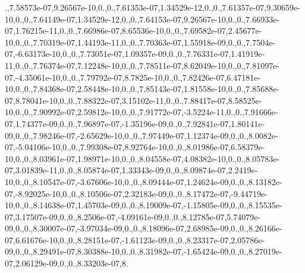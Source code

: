 \begin{DoxyCompactItemize}
.,7.\-58573e-\/07,9.\-26567e-\/10,0.,0.,7.\-61353e-\/07,1.\-34529e-\/12,0.,0.,7.\-61357e-\/07,9.\-30659e-\/10,0.,0.,7.\-64149e-\/07,1.\-34529e-\/12,0.,0.,7.\-64153e-\/07,9.\-26567e-\/10,0.,0.,7.\-66933e-\/07,1.\-76215e-\/11,0.,0.,7.\-66986e-\/07,8.\-65536e-\/10,0.,0.,7.\-69582e-\/07,2.\-45677e-\/10,0.,0.,7.\-70319e-\/07,1.\-44193e-\/11,0.,0.,7.\-70363e-\/07,1.\-55918e-\/09,0.,0.,7.\-7504e-\/07,-\/6.\-63173e-\/10,0.,0.,7.\-73051e-\/07,1.\-09357e-\/09,0.,0.,7.\-76331e-\/07,1.\-41919e-\/11,0.,0.,7.\-76374e-\/07,7.\-12248e-\/10,0.,0.,7.\-78511e-\/07,8.\-62049e-\/10,0.,0.,7.\-81097e-\/07,-\/4.\-35061e-\/10,0.,0.,7.\-79792e-\/07,8.\-7825e-\/10,0.,0.,7.\-82426e-\/07,6.\-47181e-\/10,0.,0.,7.\-84368e-\/07,2.\-58448e-\/10,0.,0.,7.\-85143e-\/07,1.\-81558e-\/10,0.,0.,7.\-85688e-\/07,8.\-78041e-\/10,0.,0.,7.\-88322e-\/07,3.\-15102e-\/11,0.,0.,7.\-88417e-\/07,8.\-58525e-\/10,0.,0.,7.\-90992e-\/07,2.\-59812e-\/10,0.,0.,7.\-91772e-\/07,-\/3.\-5224e-\/11,0.,0.,7.\-91666e-\/07,1.\-74377e-\/09,0.,0.,7.\-96897e-\/07,-\/1.\-35196e-\/09,0.,0.,7.\-92841e-\/07,1.\-80141e-\/09,0.,0.,7.\-98246e-\/07,-\/2.\-65629e-\/10,0.,0.,7.\-97449e-\/07,1.\-12374e-\/09,0.,0.,8.\-0082e-\/07,-\/5.\-04106e-\/10,0.,0.,7.\-99308e-\/07,8.\-92764e-\/10,0.,0.,8.\-01986e-\/07,6.\-58379e-\/10,0.,0.,8.\-03961e-\/07,1.\-98971e-\/10,0.,0.,8.\-04558e-\/07,4.\-08382e-\/10,0.,0.,8.\-05783e-\/07,3.\-01839e-\/11,0.,0.,8.\-05874e-\/07,1.\-33343e-\/09,0.,0.,8.\-09874e-\/07,2.\-2419e-\/10,0.,0.,8.\-10547e-\/07,-\/3.\-67606e-\/10,0.,0.,8.\-09444e-\/07,1.\-24624e-\/09,0.,0.,8.\-13182e-\/07,-\/8.\-92025e-\/10,0.,0.,8.\-10506e-\/07,2.\-32183e-\/09,0.,0.,8.\-17472e-\/07,-\/9.\-44719e-\/10,0.,0.,8.\-14638e-\/07,1.\-45703e-\/09,0.,0.,8.\-19009e-\/07,-\/1.\-15805e-\/09,0.,0.,8.\-15535e-\/07,3.\-17507e-\/09,0.,0.,8.\-2506e-\/07,-\/4.\-09161e-\/09,0.,0.,8.\-12785e-\/07,5.\-74079e-\/09,0.,0.,8.\-30007e-\/07,-\/3.\-97034e-\/09,0.,0.,8.\-18096e-\/07,2.\-68985e-\/09,0.,0.,8.\-26166e-\/07,6.\-61676e-\/10,0.,0.,8.\-28151e-\/07,-\/1.\-61123e-\/09,0.,0.,8.\-23317e-\/07,2.\-05786e-\/09,0.,0.,8.\-29491e-\/07,8.\-30388e-\/10,0.,0.,8.\-31982e-\/07,-\/1.\-65424e-\/09,0.,0.,8.\-27019e-\/07,2.\-06129e-\/09,0.,0.,8.\-33203e-\/07,8.
\end{DoxyCompactItemize}
